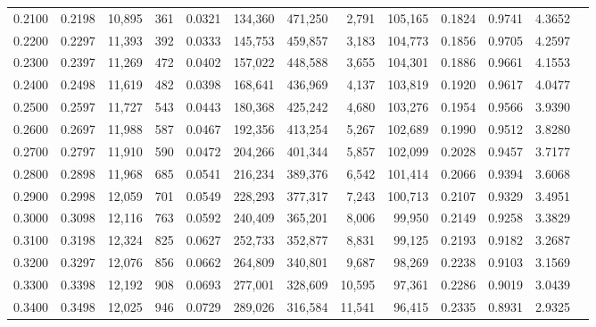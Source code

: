 \begin{tabular}{rrrrrrrrrrrrr}
0.2100 & 0.2198 & 10,895 &   361 &                                     0.0321 & 134,360 & 471,250 &   2,791 & 105,165 & 0.1824 & 0.9741 & 4.3652 \\
0.2200 & 0.2297 & 11,393 &   392 &                                     0.0333 & 145,753 & 459,857 &   3,183 & 104,773 & 0.1856 & 0.9705 & 4.2597 \\
0.2300 & 0.2397 & 11,269 &   472 &                                     0.0402 & 157,022 & 448,588 &   3,655 & 104,301 & 0.1886 & 0.9661 & 4.1553 \\
0.2400 & 0.2498 & 11,619 &   482 &                                     0.0398 & 168,641 & 436,969 &   4,137 & 103,819 & 0.1920 & 0.9617 & 4.0477 \\
0.2500 & 0.2597 & 11,727 &   543 &                                     0.0443 & 180,368 & 425,242 &   4,680 & 103,276 & 0.1954 & 0.9566 & 3.9390 \\
0.2600 & 0.2697 & 11,988 &   587 &                                     0.0467 & 192,356 & 413,254 &   5,267 & 102,689 & 0.1990 & 0.9512 & 3.8280 \\
0.2700 & 0.2797 & 11,910 &   590 &                                     0.0472 & 204,266 & 401,344 &   5,857 & 102,099 & 0.2028 & 0.9457 & 3.7177 \\
0.2800 & 0.2898 & 11,968 &   685 &                                     0.0541 & 216,234 & 389,376 &   6,542 & 101,414 & 0.2066 & 0.9394 & 3.6068 \\
0.2900 & 0.2998 & 12,059 &   701 &                                     0.0549 & 228,293 & 377,317 &   7,243 & 100,713 & 0.2107 & 0.9329 & 3.4951 \\
0.3000 & 0.3098 & 12,116 &   763 &                                     0.0592 & 240,409 & 365,201 &   8,006 &  99,950 & 0.2149 & 0.9258 & 3.3829 \\
0.3100 & 0.3198 & 12,324 &   825 &                                     0.0627 & 252,733 & 352,877 &   8,831 &  99,125 & 0.2193 & 0.9182 & 3.2687 \\
0.3200 & 0.3297 & 12,076 &   856 &                                     0.0662 & 264,809 & 340,801 &   9,687 &  98,269 & 0.2238 & 0.9103 & 3.1569 \\
0.3300 & 0.3398 & 12,192 &   908 &                                     0.0693 & 277,001 & 328,609 &  10,595 &  97,361 & 0.2286 & 0.9019 & 3.0439 \\
0.3400 & 0.3498 & 12,025 &   946 &                                     0.0729 & 289,026 & 316,584 &  11,541 &  96,415 & 0.2335 & 0.8931 & 2.9325 \\

\end{tabular}
